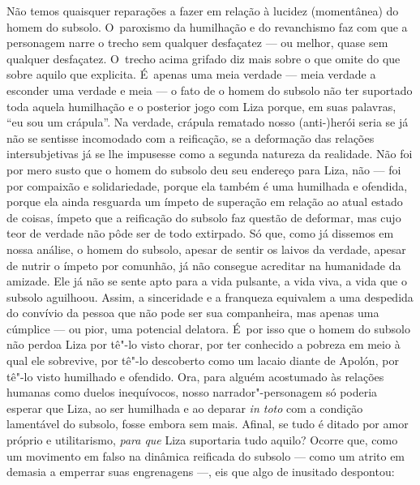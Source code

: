 Não temos quaisquer reparações a fazer em relação à lucidez (momentânea)
do homem do subsolo. O~paroxismo da humilhação e do revanchismo faz com
que a personagem narre o trecho sem qualquer desfaçatez --- ou melhor,
quase sem qualquer desfaçatez. O~trecho acima grifado diz mais sobre o
que omite do que sobre aquilo que explicita. É~apenas uma meia verdade
--- meia verdade a esconder uma verdade e meia --- o fato de o homem do
subsolo não ter suportado toda aquela humilhação e o posterior jogo com
Liza porque, em suas palavras, ``eu sou um crápula''. Na verdade,
crápula rematado nosso \mbox{(anti-)herói} seria se já não se sentisse
incomodado com a reificação, se a deformação das relações
intersubjetivas já se lhe impusesse como a segunda natureza da
realidade. Não foi por mero susto que o homem do subsolo deu seu
endereço para Liza, não --- foi por compaixão e solidariedade, porque ela
também é uma humilhada e ofendida, porque ela ainda resguarda um ímpeto
de superação em relação ao atual estado de coisas, ímpeto que a
reificação do subsolo faz questão de deformar, mas cujo teor de verdade
não pôde ser de todo extirpado. Só que, como já dissemos em nossa
análise, o homem do subsolo, apesar de sentir os laivos da verdade,
apesar de nutrir o ímpeto por comunhão, já não consegue acreditar na
humanidade da amizade. Ele já não se sente apto para a vida pulsante, a
vida viva, a vida que o subsolo aguilhoou. Assim, a sinceridade e a
franqueza equivalem a uma despedida do convívio da pessoa que não pode
ser sua companheira, mas apenas uma cúmplice --- ou pior, uma potencial
delatora. É~por isso que o homem do subsolo não perdoa Liza por tê"-lo
visto chorar, por ter conhecido a pobreza em meio à qual ele sobrevive,
por tê"-lo descoberto como um lacaio diante de Apolón, por tê"-lo visto
humilhado e ofendido. Ora, para alguém acostumado às relações humanas
como duelos inequívocos, nosso narrador"-personagem só poderia esperar
que Liza, ao ser humilhada e ao deparar \emph{in toto} com a condição
lamentável do subsolo, fosse embora sem mais. Afinal, se tudo é ditado
por amor próprio e utilitarismo, \emph{para que} Liza suportaria tudo
aquilo? Ocorre que, como um movimento em falso na dinâmica reificada do
subsolo --- como um atrito em demasia a emperrar suas engrenagens ---, eis
que algo de inusitado despontou:


